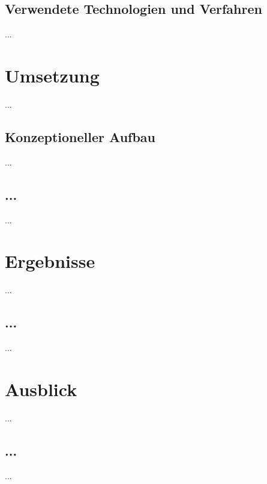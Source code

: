\documentclass[a4paper,10pt]{article}
\begin{document}
    \subsection{Verwendete Technologien und Verfahren}
    ...

\section{Umsetzung}
    ...
    \subsection{Konzeptioneller Aufbau}
    ...
    \subsection{...}
    ...

\section{Ergebnisse}
    ...
    \subsection{...}
    ...

\section{Ausblick}
    ...
    \subsection{...}
    ...
\end{document}
